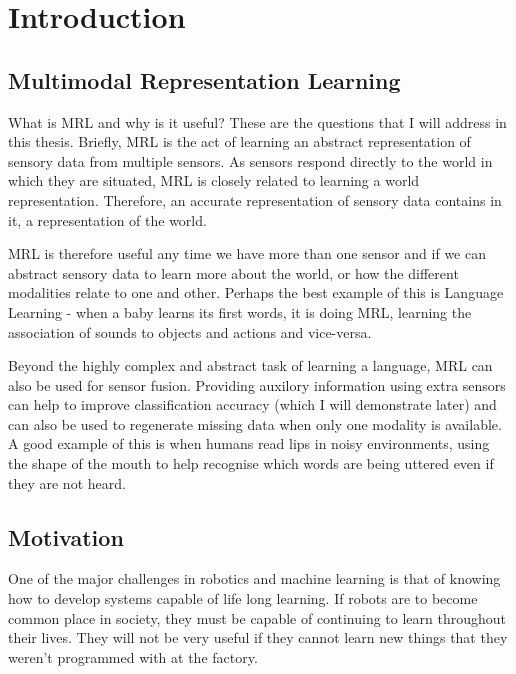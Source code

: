 
\chapter{Introduction} %

\label{Chapter1} %



\section{Multimodal Representation Learning}
What is \ac{MRL} and why is it useful? These are the questions that I will address in this thesis.
Briefly, \ac{MRL} is the act of learning an abstract representation of sensory data from multiple sensors. As sensors respond directly to the world in which they are situated, \ac{MRL} is closely related to learning a world representation. Therefore, an accurate representation of sensory data contains in it, a representation of the world.

\ac{MRL} is therefore useful any time we have more than one sensor and if we can abstract sensory data to learn more about the world, or how the different modalities relate to one and other. Perhaps the best example of this is Language Learning - when a baby learns its first words, it is doing \ac{MRL}, learning the association of sounds to objects and actions and vice-versa.

Beyond the highly complex and abstract task of learning a language, \ac{MRL} can also be used for sensor fusion. Providing auxilory information using extra sensors can help to improve classification accuracy (which I will demonstrate later) and can also be used to regenerate missing data when only one modality is available.  A good example of this is when humans read lips in noisy environments, using the shape of the mouth to help recognise which words are being uttered even if they are not heard.


\section{Motivation}
One of the major challenges in robotics and machine learning is that of knowing how to develop systems capable of life long learning. If robots are to become common place in society, they must be capable of continuing to learn throughout their lives. They will not be very useful if they cannot learn new things that they weren't programmed with at the factory.

